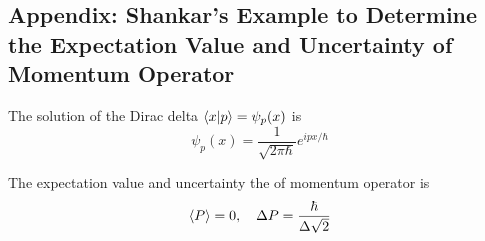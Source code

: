 \documentclass[../../../main.tex]{subfiles}
\begin{document}
\subsection{Appendix: Shankar's Example to Determine the Expectation Value and Uncertainty of Momentum Operator}
The solution of the Dirac delta $\braket{x|p}=\psi_p(x)$ is
\begin{equation*}
    \psi_p(x)=\frac{1 }{\sqrt{2\pi \hbar}}e^{ipx/\hbar}
\end{equation*}

The expectation value and uncertainty the of momentum operator is
\begin{equation*}
    \braket{P}=0,\quad\Delta P=\frac{\hbar}{\Delta\sqrt{2}}
\end{equation*}
\end{document}
